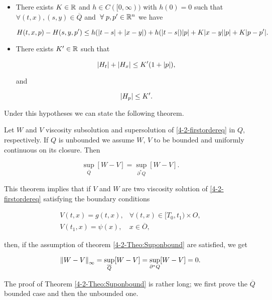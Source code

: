 \begin{itemize}\label{4-2-Hassumptions}
    \item There exists $K\in\mathbb{R}$ and $h\in C([0,\infty))$ with $h(0)=0$ such that $\forall (t,x),(s,y)\in\overline{Q}$ and $\forall p,p'\in\R^n$ we have
    
    \[H(t,x,p)-H(s,y,p')\leq h(\abs{t-s}+\abs{x-y})+h(\abs{t-s})\abs{p}+K\abs{x-y}\abs{p} + K\abs{p-p'}.\]
    
    \item There exists $K'\in\mathbb{R}$ such that
    
    \[\abs{H_t}+\abs{H_x}\leq K'(1+\abs{p}),\]

    and

    \[\abs{H_p}\leq K'.\]
\end{itemize}

Under this hypotheses we can state the following theorem.

\begin{theorem}\label{4-2-Theo:Suponbound}
    Let $W$ and $V$ viscosity subsolution and supersolution of \ref{4-2-firstordereq} in $Q$, respectively. If $Q$ is unbounded we assume $W$, $V$ to be bounded and 
    uniformly continuous on its closure. Then
    
    \[\sup_{\overline{Q}}[W-V] = \sup_{\partial^{\ast}Q}[W-V].\]
\end{theorem}

This theorem implies that if $V$ and $W$ are two viscosity solution of \ref{4-2-firstordereq} satisfying the boundary conditions

\begin{equation}\label{4-2-TerminalcondV}
    \begin{aligned}
        V(t,x) = g(t,x),&\forall(t,x)\in[T_0,t_1)\times O, \\
        V(t_1,x) = \psi(x),&x\in\overline{O},
    \end{aligned}
\end{equation}

then, if the assumption of theorem \ref{4-2-Theo:Suponbound} are satisfied, we get

\[\norm{W-V}_{\infty} = \sup_{\overline{Q}}[W-V]=\sup_{\partial^{\ast}Q}[W-V] = 0.\]

The proof of Theorem \ref{4-2-Theo:Suponbound} is rather long; we first prove the $\overline{Q}$ bounded case and then the unbounded one.

